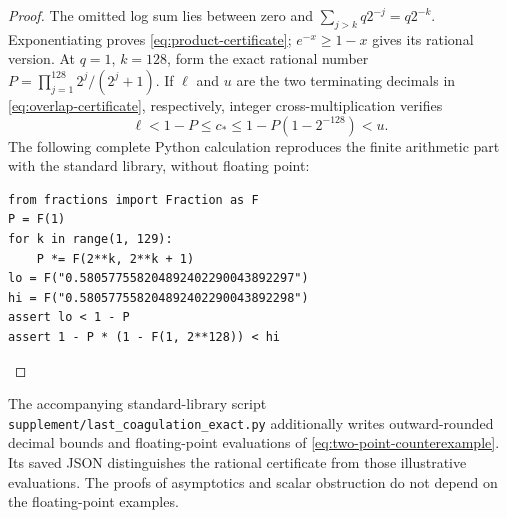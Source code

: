 \begin{proof}
The omitted log sum lies between zero and
$\sum_{j>k}q2^{-j}=q2^{-k}$. Exponentiating proves
\eqref{eq:product-certificate}; $e^{-x}\geq1-x$ gives its
rational version. At $q=1$, $k=128$, form the exact rational
number $P=\prod_{j=1}^{128}2^j/(2^j+1)$. If $\ell$ and $u$
are the two terminating decimals in \eqref{eq:overlap-certificate},
respectively, integer cross-multiplication verifies
\[
 \ell<1-P\leq c_*\leq1-P(1-2^{-128})<u.
\]
The following complete Python calculation reproduces the finite
arithmetic part with the standard library, without floating point:
\begin{verbatim}
from fractions import Fraction as F
P = F(1)
for k in range(1, 129):
    P *= F(2**k, 2**k + 1)
lo = F("0.580577558204892402290043892297")
hi = F("0.580577558204892402290043892298")
assert lo < 1 - P
assert 1 - P * (1 - F(1, 2**128)) < hi
\end{verbatim}
\end{proof}

The accompanying standard-library script
\texttt{supplement/last\_coagulation\_exact.py} additionally writes
outward-rounded decimal bounds and floating-point evaluations of
\eqref{eq:two-point-counterexample}. Its saved JSON distinguishes
the rational certificate from those illustrative evaluations.
The proofs of asymptotics and scalar obstruction do not depend on
the floating-point examples.
